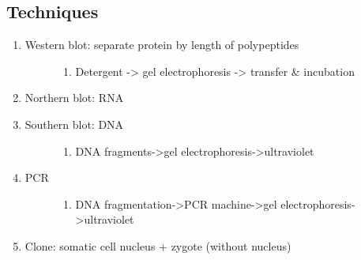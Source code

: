 \documentclass[letterpaper,10pt,english]{sphinxmanual}
\begin{document}
\subsection{Techniques}
\label{\detokenize{neuroscience/biology:techniques}}\begin{enumerate}
\item {} \begin{description}
\item[{Western blot: separate protein by length of polypeptides}] \leavevmode\begin{enumerate}
\item {} 
Detergent -\textgreater{} gel electrophoresis -\textgreater{} transfer \& incubation

\end{enumerate}

\end{description}

\item {} 
Northern blot: RNA

\item {} \begin{description}
\item[{Southern blot: DNA}] \leavevmode\begin{enumerate}
\item {} 
DNA fragments-\textgreater{}gel electrophoresis-\textgreater{}ultraviolet

\end{enumerate}

\end{description}

\item {} \begin{description}
\item[{PCR}] \leavevmode\begin{enumerate}
\item {} 
DNA fragmentation-\textgreater{}PCR machine-\textgreater{}gel electrophoresis-\textgreater{}ultraviolet

\end{enumerate}

\end{description}

\item {} 
Clone: somatic cell nucleus + zygote (without nucleus)

\end{enumerate}
\end{document}
